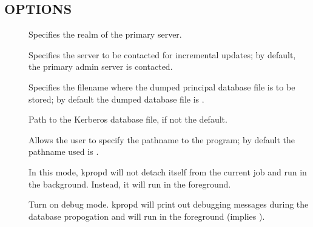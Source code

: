 \documentclass[letterpaper,10pt,english]{sphinxmanual}
\begin{document}
\subsection{OPTIONS}
\label{\detokenize{admin/admin_commands/kpropd:options}}\begin{description}
\item[{ }] \leavevmode
\sphinxAtStartPar
Specifies the realm of the primary server.

\item[{ }] \leavevmode
\sphinxAtStartPar
Specifies the server to be contacted for incremental updates; by
default, the primary admin server is contacted.

\item[{ }] \leavevmode
\sphinxAtStartPar
Specifies the filename where the dumped principal database file is
to be stored; by default the dumped database file is {\hyperref[\detokenize{mitK5defaults:paths}]{}}.

\item[{ }] \leavevmode
\sphinxAtStartPar
Path to the Kerberos database file, if not the default.

\item[{}] \leavevmode
\sphinxAtStartPar
Allows the user to specify the pathname to the {\hyperref[\detokenize{admin/admin_commands/kdb5_util:kdb5-util-8}]{}}
program; by default the pathname used is {\hyperref[\detokenize{mitK5defaults:paths}]{}}.

\item[{}] \leavevmode
\sphinxAtStartPar
In this mode, kpropd will not detach itself from the current job
and run in the background.  Instead, it will run in the
foreground.

\item[{}] \leavevmode
\sphinxAtStartPar
Turn on debug mode.  kpropd will print out debugging messages
during the database propogation and will run in the foreground
(implies ).


\end{description}
\end{document}
